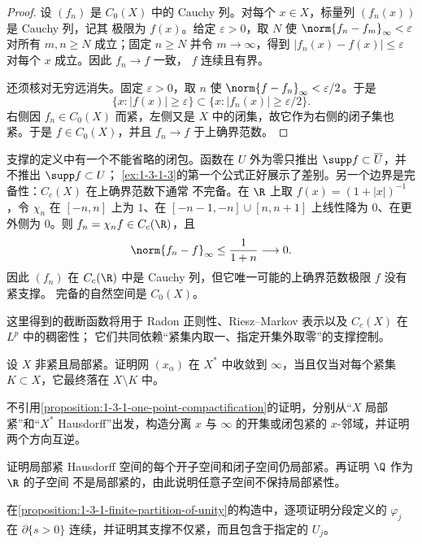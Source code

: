 \begin{proof}
设 $(f_n)$ 是 $C_0(X)$ 中的 Cauchy 列。对每个 $x\in X$，标量列 $(f_n(x))$ 是 Cauchy 列，记其
极限为 $f(x)$。给定 $\varepsilon>0$，取 $N$ 使
$\norm{f_n-f_m}_\infty<\varepsilon$ 对所有 $m,n\ge N$ 成立；固定 $n\ge N$ 并令
$m\to\infty$，得到 $|f_n(x)-f(x)|\le\varepsilon$ 对每个 $x$ 成立。因此 $f_n\to f$ 一致，
$f$ 连续且有界。

还须核对无穷远消失。固定 $\varepsilon>0$，取 $n$ 使
$\norm{f-f_n}_\infty<\varepsilon/2$。于是
\[
 \{x:|f(x)|\ge\varepsilon\}
 \subset \{x:|f_n(x)|\ge\varepsilon/2\}.
\]
右侧因 $f_n\in C_0(X)$ 而紧，左侧又是 $X$ 中的闭集，故它作为右侧的闭子集也紧。于是
$f\in C_0(X)$，并且 $f_n\to f$ 于上确界范数。
\end{proof}

支撑的定义中有一个不能省略的闭包。函数在 $U$ 外为零只推出
$\supp f\subset\overline U$，并不推出 $\supp f\subset U$；
\cref{ex:1-3-1-3}的第一个公式正好展示了差别。另一个边界是完备性：$C_c(X)$ 在上确界范数下通常
不完备。在 $\R$ 上取 $f(x)=(1+|x|)^{-1}$，令 $\chi_n$ 在 $[-n,n]$ 上为 $1$、在
$[-n-1,-n]\cup[n,n+1]$ 上线性降为 $0$、在更外侧为 $0$。则
$f_n=\chi_nf\in C_c(\R)$，且
\[
  \norm{f_n-f}_\infty\le\frac{1}{1+n}\longrightarrow0.
\]
因此 $(f_n)$ 在 $C_c(\R)$ 中是 Cauchy 列，但它唯一可能的上确界范数极限 $f$ 没有紧支撑。
完备的自然空间是 $C_0(X)$。

这里得到的截断函数将用于 Radon 正则性、Riesz--Markov 表示以及 $C_c(X)$ 在 $L^p$ 中的稠密性；
它们共同依赖“紧集内取一、指定开集外取零”的支撑控制。

\begin{exercise}[一点紧化中的收敛]
设 $X$ 非紧且局部紧。证明网 $(x_\alpha)$ 在 $X^*$ 中收敛到 $\infty$，当且仅当对每个紧集
$K\subset X$，它最终落在 $X\setminus K$ 中。
\end{exercise}

\begin{exercise}[重建一点紧化判据]
不引用\cref{proposition:1-3-1-one-point-compactification}的证明，分别从“$X$ 局部紧”和“$X^*$
Hausdorff”出发，构造分离 $x$ 与 $\infty$ 的开集或闭包紧的 $x$-邻域，并证明两个方向互逆。
\end{exercise}

\begin{exercise}[局部紧性的遗传]
证明局部紧 Hausdorff 空间的每个开子空间和闭子空间仍局部紧。再证明 $\Q$ 作为 $\R$ 的子空间
不是局部紧的，由此说明任意子空间不保持局部紧性。
\end{exercise}

\begin{exercise}[有限单位分解的直接核对]
在\cref{proposition:1-3-1-finite-partition-of-unity}的构造中，逐项证明分段定义的 $\varphi_j$ 在
$\partial\{s>0\}$ 连续，并证明其支撑不仅紧，而且包含于指定的 $U_j$。
\end{exercise}

